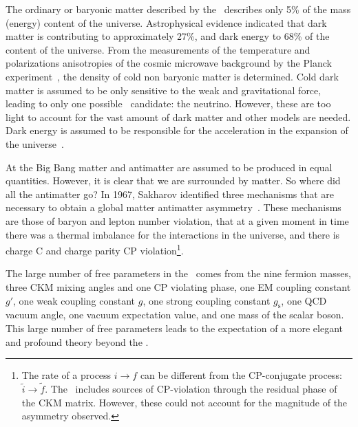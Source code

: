 The ordinary or baryonic matter described by the \SM\ describes only 5\% of the mass (energy) content of the universe. Astrophysical evidence indicated that dark matter is contributing to approximately 27\%, and dark energy to 68\% of the content of the universe. From the measurements of the temperature and polarizations anisotropies of the cosmic microwave background by the Planck experiment~\cite{Ade:2015xua}, the density of cold non baryonic matter is determined. Cold dark matter is assumed to be only sensitive to the weak and gravitational force, leading to only one possible \SM\ candidate: the neutrino. However, these are too light to account for the vast amount of dark matter and other models are needed. Dark energy is assumed to be responsible for the acceleration in the expansion of the universe~\cite{Peebles:2002gy}. 

At the Big Bang matter and antimatter are assumed to be produced in equal quantities. However, it  is clear that we are surrounded by matter. So where did all the antimatter go? In 1967, Sakharov identified three mechanisms that are necessary to obtain a global matter antimatter asymmetry~\cite{Sakharov}. These mechanisms are those of baryon and lepton number violation, that at a given moment in time there was a thermal imbalance for the interactions in the universe, and there is charge C and charge parity CP violation\footnote{The rate of a process $i\rightarrow f$ can be different from the CP-conjugate process: $\tilde i \rightarrow \tilde f$. The \SM\ includes sources of CP-violation through the residual phase of the CKM matrix. However, these could not account for the magnitude of the asymmetry observed.}.

The large number of free parameters in the \SM\ comes from the nine fermion masses, three CKM mixing angles and one CP violating phase, one EM coupling constant $g'$, one weak coupling constant $g$, one strong coupling constant $g_{\mathrm{s}}$, one QCD vacuum angle, one vacuum expectation value, and one mass of the scalar boson. This large number of free parameters leads to the expectation of a more elegant and profound theory beyond the \SM. 

